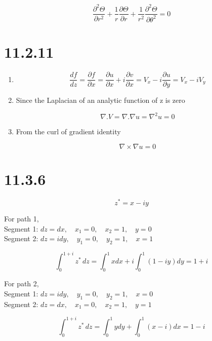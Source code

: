 \documentclass[12pt]{article}
\begin{document}
\[
    \frac{\partial^2 \Theta}{\partial r^2} + \frac{1}{r}\frac{\partial \Theta}{\partial r} + \frac{1}{r^2}\frac{\partial^2 \Theta}{\partial \theta^2} = 0
\]


\newpage
\section{11.2.11}

\begin{enumerate}
    \item

          \[
              \frac{df}{dz} = \frac{\partial f}{\partial x} = \frac{\partial u}{\partial x} + i \frac{\partial v}{\partial x} = V_x - i \frac{\partial u}{\partial y} = V_x - i V_y
          \]

    \item

          Since the Laplacian of an analytic function of z is zero

          \[
              \nabla . V =  \nabla . \nabla u = \nabla^2 u = 0
          \]

    \item

          From the curl of gradient identity

          \[
              \nabla \times \nabla u = 0
          \]

\end{enumerate}

\newpage
\section{11.3.6}

\[
    z^* = x-iy
\]

For path 1, \\
Segment 1: \(dz = dx, \quad x_1 = 0, \quad x_2 = 1, \quad y = 0\) \\
Segment 2: \(dz = idy, \quad y_1 = 0, \quad y_2 = 1, \quad x = 1\)

\[
    \int_0^{1+i} z^* \, dz= \int_0^{1} xdx + i\int_0^{1} (1-iy)dy
    = 1 + i
\]

For path 2, \\
Segment 1: \(dz = idy, \quad y_1 = 0, \quad y_2 = 1, \quad x = 0\) \\
Segment 2: \(dz = dx, \quad x_1 = 0, \quad x_2 = 1, \quad y = 1\)

\[
    \int_0^{1+i} z^* \, dz = \int_0^{1} y dy + \int_0^{1} (x - i)dx
    = 1 - i
\]
\end{document}
